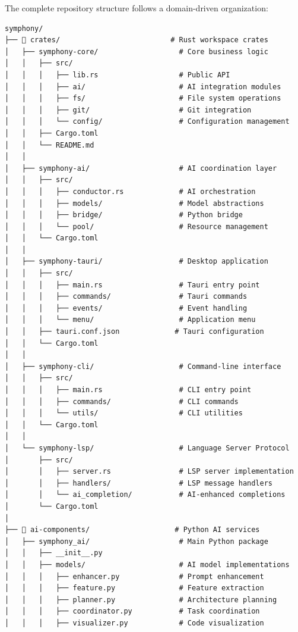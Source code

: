 The complete repository structure follows a domain-driven organization:

\begin{lstlisting}[language=text, caption=Complete Repository Structure]
symphony/
├── 📁 crates/                          # Rust workspace crates
│   ├── symphony-core/                   # Core business logic
│   │   ├── src/
│   │   │   ├── lib.rs                   # Public API
│   │   │   ├── ai/                      # AI integration modules
│   │   │   ├── fs/                      # File system operations
│   │   │   ├── git/                     # Git integration
│   │   │   └── config/                  # Configuration management
│   │   ├── Cargo.toml
│   │   └── README.md
│   │
│   ├── symphony-ai/                     # AI coordination layer
│   │   ├── src/
│   │   │   ├── conductor.rs             # AI orchestration
│   │   │   ├── models/                  # Model abstractions
│   │   │   ├── bridge/                  # Python bridge
│   │   │   └── pool/                    # Resource management
│   │   └── Cargo.toml
│   │
│   ├── symphony-tauri/                  # Desktop application
│   │   ├── src/
│   │   │   ├── main.rs                  # Tauri entry point
│   │   │   ├── commands/                # Tauri commands
│   │   │   ├── events/                  # Event handling
│   │   │   └── menu/                    # Application menu
│   │   ├── tauri.conf.json             # Tauri configuration
│   │   └── Cargo.toml
│   │
│   ├── symphony-cli/                    # Command-line interface
│   │   ├── src/
│   │   │   ├── main.rs                  # CLI entry point
│   │   │   ├── commands/                # CLI commands
│   │   │   └── utils/                   # CLI utilities
│   │   └── Cargo.toml
│   │
│   └── symphony-lsp/                    # Language Server Protocol
│       ├── src/
│       │   ├── server.rs                # LSP server implementation
│       │   ├── handlers/                # LSP message handlers
│       │   └── ai_completion/           # AI-enhanced completions
│       └── Cargo.toml
│
├── 📁 ai-components/                    # Python AI services
│   ├── symphony_ai/                     # Main Python package
│   │   ├── __init__.py
│   │   ├── models/                      # AI model implementations
│   │   │   ├── enhancer.py              # Prompt enhancement
│   │   │   ├── feature.py               # Feature extraction
│   │   │   ├── planner.py               # Architecture planning
│   │   │   ├── coordinator.py           # Task coordination
│   │   │   ├── visualizer.py            # Code visualization

\end{lstlisting}
